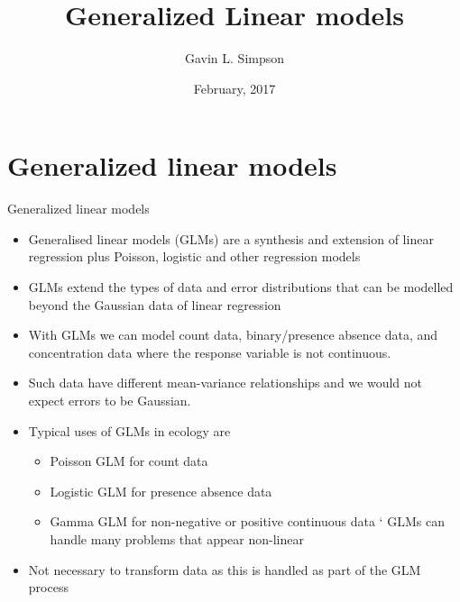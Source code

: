 \documentclass[10pt,ignorenonframetext,compress, aspectratio=169]{beamer}
\title{Generalized Linear models}
\author{Gavin L. Simpson}
\date{February, 2017}
\providecommand{\tightlist}{%
  \setlength{\itemsep}{0pt}\setlength{\parskip}{0pt}}
\begin{document}
\frame{\titlepage}

\section{Generalized linear models}\label{generalized-linear-models}

\begin{frame}{Generalized linear models}

\begin{itemize}
\tightlist
\item
  Generalised linear models (GLMs) are a synthesis and extension of
  linear regression plus Poisson, logistic and other regression models
\item
  GLMs extend the types of data and error distributions that can be
  modelled beyond the Gaussian data of linear regression
\item
  With GLMs we can model count data, binary/presence absence data, and
  concentration data where the response variable is not continuous.
\item
  Such data have different mean-variance relationships and we would not
  expect errors to be Gaussian.
\item
  Typical uses of GLMs in ecology are

  \begin{itemize}
  \tightlist
  \item
    Poisson GLM for count data
  \item
    Logistic GLM for presence absence data
  \item
    Gamma GLM for non-negative or positive continuous data ` GLMs can
    handle many problems that appear non-linear
  \end{itemize}
\item
  Not necessary to transform data as this is handled as part of the GLM
  process
\end{itemize}

\end{frame}
\end{document}
